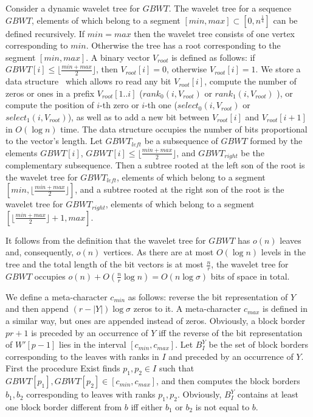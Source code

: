 \documentclass[10pt]{llncs}
\newcommand{\exist}{{\sc Exist}}
\newcommand{\GBWT}{\mathit{GBWT}}
\newcommand{\B}{\mathit{B}}
\begin{document}
Consider a dynamic wavelet tree for $\GBWT$. The wavelet tree for a sequence $\GBWT$, elements of which belong to a segment $[min, max] \subset [0,n^{\frac{1}{4}}]$ can be defined recursively. If $min = max$ then the wavelet tree consists of one vertex corresponding to $min$. Otherwise the tree has a root corresponding to the segment $[min,max]$. A binary vector $V_{root}$ is defined as follows: if $\GBWT[i] \leq \lfloor\frac{min+max}{2}\rfloor$, then $V_{root}[i] = 0$, otherwise $V_{root}[i] = 1$. We store a data structure~\cite{Makinen:2008:DES:1367064.1367072} which allows ro read any bit $V_{root}[i]$, compute the number of zeros or ones in a prefix $V_{root}[1..i]$ ($rank_0(i, V_{root})$ or $rank_1(i,V_{root})$ ), or compute the position of $i$-th zero or $i$-th one ($select_0(i, V_{root})$ or $select_1(i,V_{root})$), as well as to add a new bit between $V_{root}[i]$ and $V_{root}[i+1]$ in $O(\log n)$ time. The data structure occupies the number of bits proportional to the vector's length. Let $\GBWT_{left}$ be a subsequence of $\GBWT$ formed by the elements $\GBWT[i]$, $\GBWT[i] \leq \lfloor\frac{min+max}{2}\rfloor$, and $\GBWT_{right}$ be the complementary subsequence. Then a subtree rooted at the left son of the root is the wavelet tree for $\GBWT_{left}$, elements of which belong to a segment $[min, \lfloor\frac{min+max}{2}\rfloor]$, and a subtree rooted at the right son of the root is the wavelet tree for $\GBWT_{right}$, elements of which belong to a segment $[\lfloor\frac{min+max}{2}\rfloor + 1, max]$.

It follows from the definition that the wavelet tree for $\GBWT$ has $o(n)$ leaves and, consequently, $o(n)$ vertices. As there are at most $O(\log n)$ levels in the tree and the total length of the bit vectors is at most $\frac{n}{r}$, the wavelet tree for $\GBWT$ occupies $o(n) + O(\frac{n}{r} \log n) = O(n \log \sigma)$ bits of space in total.

We define a meta-character $c_{min}$ as follows: reverse the bit representation of $Y$ and then append $(r-|Y|)\log{\sigma}$ zeros to it. A meta-character $c_{max}$ is defined in a similar way, but ones are appended instead of zeros. Obviously, a block border $pr+1$ is preceded by an occurrence of $Y$ iff the reverse of the bit representation of $W'[p-1]$ lies in the interval $[c_{min},c_{max}]$. Let $B^Y_I$ be the set of block borders corresponding to the leaves with ranks in $I$ and preceded by an occurrence of $Y$. First the procedure \exist{} finds $p_1, p_2 \in I$ such that $\GBWT[p_1], \GBWT[p_2] \in [c_{min},c_{max}]$, and then computes the block borders $b_1, b_2$ corresponding to leaves with ranks $p_1, p_2$. Obviously, $\B^Y_I$ contains at least one block border different from $b$ iff either $b_1$ or $b_2$ is not equal to $b$.
\end{document}

